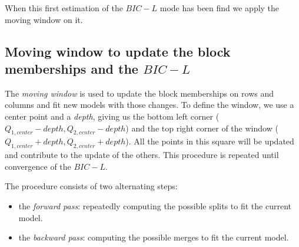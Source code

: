 \documentclass[12pt,a4paper]{report}
\begin{document}

When this first estimation of the $BIC-L$ mode has been find we apply the moving
window on it.
\subsection{Moving window to update the block memberships and the $BIC-L$}
The \emph{moving window} is used to update the block memberships on rows and 
columns and fit new models with those changes.
To define the window, we use a center point and a \emph{depth}, giving us the 
bottom left corner ($Q_{1,center} - depth, Q_{2,center} - depth$) and the top right corner of the 
window ($Q_{1,center} + depth, Q_{2,center} + depth$). All the points in this square will be 
updated and contribute to the update of the others.
This procedure is repeated until convergence of the $BIC-L$.

The procedure consists of two alternating steps:
\begin{itemize}
    \item the \emph{forward pass}: repeatedly computing the possible splits to 
    fit the current model.
    \item the \emph{backward pass}: computing the possible merges to fit the current model.
\end{itemize}
\end{document}
